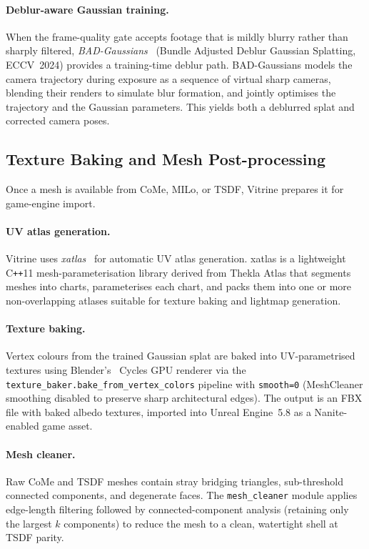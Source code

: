 \paragraph{Deblur-aware Gaussian training.}
When the frame-quality gate accepts footage that is mildly blurry rather than
sharply filtered, \emph{BAD-Gaussians}~\cite{zhao2024_badgaussians} (Bundle
Adjusted Deblur Gaussian Splatting, ECCV~2024) provides a training-time deblur
path.  BAD-Gaussians models the camera trajectory during exposure as a sequence of
virtual sharp cameras, blending their renders to simulate blur formation, and
jointly optimises the trajectory and the Gaussian parameters.  This yields both a
deblurred splat and corrected camera poses.

\subsection{Texture Baking and Mesh Post-processing}
\label{sec:tech:texture}

Once a mesh is available from CoMe, MILo, or TSDF, Vitrine prepares it for
game-engine import.

\paragraph{UV atlas generation.}
Vitrine uses \emph{xatlas}~\cite{xatlas2018} for automatic UV atlas generation.
xatlas is a lightweight C\texttt{++}11 mesh-parameterisation library derived from
Thekla Atlas that segments meshes into charts, parameterises each chart, and packs
them into one or more non-overlapping atlases suitable for texture baking and
lightmap generation.

\paragraph{Texture baking.}
Vertex colours from the trained Gaussian splat are baked into UV-parametrised
textures using Blender's~\cite{blender2024} Cycles GPU renderer via the
\texttt{texture\_baker.bake\_from\_vertex\_colors} pipeline with \texttt{smooth=0}
(MeshCleaner smoothing disabled to preserve sharp architectural edges).  The output
is an FBX file with baked albedo textures, imported into Unreal Engine~5.8 as a
Nanite-enabled game asset.

\paragraph{Mesh cleaner.}
Raw CoMe and TSDF meshes contain stray bridging triangles, sub-threshold connected
components, and degenerate faces.  The \texttt{mesh\_cleaner} module applies
edge-length filtering followed by connected-component analysis (retaining only the
largest $k$ components) to reduce the mesh to a clean, watertight shell at TSDF
parity.

